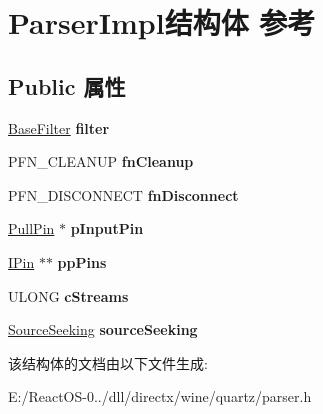 \hypertarget{struct_parser_impl}{}\section{Parser\+Impl结构体 参考}
\label{struct_parser_impl}
\subsection*{Public 属性}
\begin{DoxyCompactItemize}
\item 
\mbox{\label{struct_parser_impl_a57e1f7e6efb6a4c5576b67f46816c749}} 
\hyperlink{struct_base_filter}{Base\+Filter} {\bfseries filter}
\item 
\mbox{\label{struct_parser_impl_a14bf293eff6608aa33fa603553e9e3e4}} 
P\+F\+N\+\_\+\+C\+L\+E\+A\+N\+UP {\bfseries fn\+Cleanup}
\item 
\mbox{\label{struct_parser_impl_ad74402dfd007e86dfa51a4efff457304}} 
P\+F\+N\+\_\+\+D\+I\+S\+C\+O\+N\+N\+E\+CT {\bfseries fn\+Disconnect}
\item 
\mbox{\label{struct_parser_impl_a6e5bd3badd9a2d2cfc2c1e5065ed9288}} 
\hyperlink{struct_pull_pin}{Pull\+Pin} $\ast$ {\bfseries p\+Input\+Pin}
\item 
\mbox{\label{struct_parser_impl_ab991fcf6aebdf23625b08c1884d84527}} 
\hyperlink{interface_i_pin}{I\+Pin} $\ast$$\ast$ {\bfseries pp\+Pins}
\item 
\mbox{\label{struct_parser_impl_a17161a113482947ae4b6a14ee8c9932e}} 
U\+L\+O\+NG {\bfseries c\+Streams}
\item 
\mbox{\label{struct_parser_impl_aa72188ccf636758b9c4520c635f951cb}} 
\hyperlink{struct_source_seeking}{Source\+Seeking} {\bfseries source\+Seeking}
\end{DoxyCompactItemize}


该结构体的文档由以下文件生成\+:\begin{DoxyCompactItemize}
\item 
E\+:/\+React\+O\+S-\/0../dll/directx/wine/quartz/parser.\+h\end{DoxyCompactItemize}
